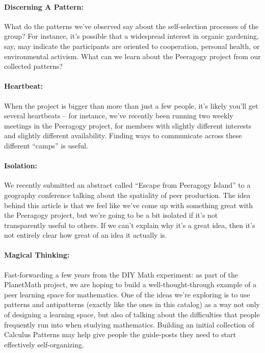 \paragraph{Discerning A Pattern:} What do the patterns we’ve observed say about the self-selection
processes of the group? For instance, it’s possible that a widespread
interest in organic gardening, say, may indicate the participants are
oriented to cooperation, personal health, or environmental activism.
What can we learn about the Peeragogy project from our collected
patterns?

\paragraph{Heartbeat:} When the project is bigger than more than just a few people, it’s likely
you’ll get several heartbeats – for instance, we’ve recently been
running two weekly meetings in the Peeragogy project, for members with
slightly different interests and slightly different availability.
Finding ways to communicate across these different “camps” is useful.

\paragraph{Isolation:} We recently submitted an abstract called “Escape from Peeragogy Island”
to a geography conference talking about the spatiality of peer
production. The idea behind this article is that we feel like we’ve come
up with something great with the Peeragogy project, but we’re going to
be a bit isolated if it’s not transparently useful to others. If we
can’t explain why it’s a great idea, then it’s not entirely clear how
great of an idea it actually is.

\paragraph{Magical Thinking:}  Fast-forwarding a few years from the DIY Math experiment: as part of the
PlanetMath project, we are hoping to build a well-thought-through
example of a peer learning space for mathematics. One of the ideas we’re
exploring is to use patterns and antipatterns (exactly like the ones in
this catalog) as a way not only of designing a learning space, but also
of talking about the difficulties that people frequently run into when
studying mathematics. Building an initial collection of Calculus
Patterns may help give people the guide-posts they need to start
effectively self-organizing.

